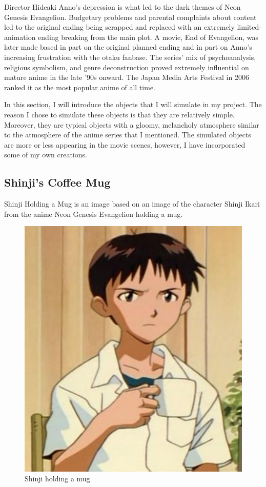 \documentclass[runningheads]{llncs}
\begin{document}
    Director Hideaki Anno's depression \cite{myanimelist.net} is what led to the dark themes of Neon Genesis Evangelion. Budgetary problems and parental complaints about content led to the original ending being scrapped and replaced with an extremely limited-animation ending breaking from the main plot. A movie, End of Evangelion, was later made based in part on the original planned ending and in part on Anno's increasing frustration with the otaku fanbase. The series' mix of psychoanalysis, religious symbolism, and genre deconstruction proved extremely influential on mature anime in the late '90s onward. The Japan Media Arts Festival in 2006 ranked it as the most popular anime of all time.
    
    In this section, I will introduce the objects that I will simulate in my project. The reason I chose to simulate these objects is that they are relatively simple. Moreover, they are typical objects with a gloomy, melancholy atmosphere similar to the atmosphere of the anime series that I mentioned. The simulated objects are more or less appearing in the movie scenes, however, I have incorporated some of my own creations.
    
    \subsection{Shinji's Coffee Mug}
        Shinji Holding a Mug \cite{13_2021} is an image based on an image of the character Shinji Ikari from the anime Neon Genesis Evangelion holding a mug.
        
        \begin{figure}[!ht]
            \centering
            \includegraphics[width=.3\textwidth]{assets/tumblr_mjkfjrIFyZ1s8r2c1o1_400.jpg}
            \caption{Shinji holding a mug \protect\footnotemark}
            \label{fig:shinji}
            
        \end{figure}
        
        
\end{document}
